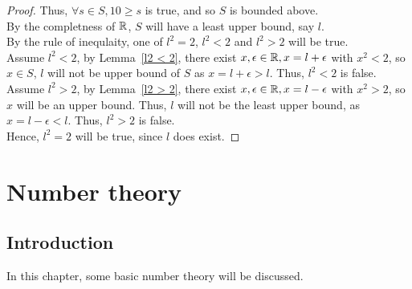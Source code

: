 \documentclass[a4paper]{article}
\begin{document}
\begin{proof}
Thus, $\forall s \in S, 10 \geq s$ is true, and so $S$ is bounded above.\\
By the completness of $\mathbb{R}$, $S$ will have a least upper bound, say $l$.\\
By the rule of inequlaity, one of $l^2 = 2$, $l^2 < 2$ and $l^2 > 2$ will be true.\\
Assume $l^2 < 2$, by Lemma~\ref{l2 < 2}, there exist $x, \epsilon \in \mathbb{R}, x = l + \epsilon$ with $x^2 < 2$, so $x \in S$, $l$ will not be upper bound of $S$ as $x = l + \epsilon> l$. Thus, $l^2 < 2$ is false.\\
Assume $l^2 > 2$, by Lemma~\ref{l2 > 2}, there exist $x, \epsilon \in \mathbb{R}, x = l - \epsilon$ with $x^2 > 2$, so $x$ will be an upper bound. Thus, $l$ will not be the least upper bound, as $x = l - \epsilon < l$. Thus, $l^2 > 2$ is false.\\
Hence, $l^2 = 2$ will be true, since $l$ does exist.
\end{proof}

\section{Number theory}
\subsection{Introduction}
In this chapter, some basic number theory will be discussed.
\end{document}
